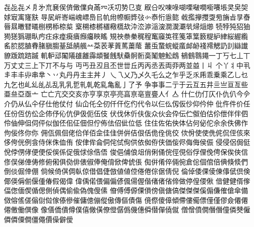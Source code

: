 %
%
%

㐂󠄀㐂󠄁㐂󠄂㐅󠄀㐆󠄀㐧󠄀㐬󠄀㐮󠄀㑨󠄀㑪󠄀㒈󠄀㒒󠄀㒵󠄀㒼󠄀㓁󠄀㓇󠄀㓛󠄀㔟󠄀㔾󠄀㕝󠄀
㕞󠄀㕣󠄀㕮󠄀㖦󠄀㖨󠄀㗅󠄀㗚󠄀㗞󠄀㗴󠄀㘅󠄀㘔󠄀㙊󠄀㚑󠄀㚖󠄀㚙󠄀㛏󠄀㝡󠄀㝢󠄀㝫󠄀㝬󠄀
㝵󠄀㞍󠄀㟁󠄀㟢󠄀㟨󠄀㟴󠄀㟽󠄀㠀󠄀㠯󠄀㠶󠄀㡀󠄀㡜󠄀㡡󠄀㢡󠄀㢭󠄀㣺󠄀㤗󠄀㤚󠄀㥯󠄀㦤󠄀
㦸󠄀㩜󠄀㩮󠄀㩳󠄀㪅󠄀㫄󠄀㫋󠄀㫖󠄀㫗󠄀㫪󠄀㫳󠄀㬎󠄀㬚󠄀㬜󠄀㬢󠄀㭭󠄀㭷󠄀㮇󠄀㮈󠄀㮍󠄀
㮤󠄀㮶󠄀㯃󠄀㯍󠄀㯰󠄀㯳󠄀㰏󠄀㰦󠄀㳃󠄀㳒󠄀㴑󠄀㴞󠄀㴱󠄀㵎󠄀㵤󠄀㶚󠄀㷀󠄀㷌󠄀㷔󠄀㸅󠄀
㸿󠄀㹀󠄀㹠󠄀㹦󠄀㹨󠄀㺃󠄀㺊󠄀㺔󠄀㻚󠄀㽗󠄀㽲󠄀㽵󠄀㽷󠄀㾮󠄀㾱󠄀㿉󠄀㿗󠄀㿜󠄀䀹󠄀䁘󠄀
䂓󠄀䄃󠄀䄅󠄀䅈󠄀䅏󠄀䅣󠄀䆴󠄀䆿󠄀䇦󠄀䇮󠄀䇳󠄀䈇󠄀䈎󠄀䉤󠄀䊓󠄀䋆󠄀䋖󠄀䋝󠄀䌂󠄀䌫󠄀
䍃󠄀䏮󠄀䏰󠄀䐈󠄀䐌󠄀䐗󠄀䐜󠄀䐢󠄀䑓󠄀䑛󠄀䑶󠄀䑺󠄀䒑󠄀䒳󠄀䒾󠄀䓔󠄀䔈󠄀䔍󠄀䔥󠄀䕃󠄀
䕺󠄀䖝󠄀䖸󠄀䖾󠄀䗥󠄀䗪󠄀䘏󠄀䘐󠄀䙁󠄀䙥󠄀䚡󠄀䚮󠄀䚯󠄀䜌󠄀䜟󠄀䝤󠄀䟦󠄀䟽󠄀䠖󠄀䠞󠄀
䡄󠄀䡎󠄀䢵󠄀䦰󠄀䧧󠄀䧺󠄀䨄󠄀䨩󠄀䪼󠄀䬸󠄀䬻󠄀䭾󠄀䯂󠄀䯊󠄀䯒󠄀䯨󠄀䰗󠄀䰠󠄀䰸󠄀䳄󠄀
䳑󠄀䳡󠄀䴇󠄀䵷󠄀一󠄀丁󠄀丂󠄀七󠄀丄󠄀丅󠄀万󠄀丈󠄀丈󠄁三󠄀上󠄀下󠄀丌󠄀不󠄀与󠄀与󠄁
丏󠄀丐󠄀丑󠄀丒󠄀且󠄀丕󠄀世󠄀丗󠄀丘󠄀丙󠄀丙󠄁丞󠄀丟󠄀両󠄀丣󠄀两󠄀並󠄀並󠄁丨󠄀丩󠄀
个󠄀丫󠄀丬󠄀中󠄀丮󠄀丯󠄀丰󠄀丰󠄁丱󠄀串󠄀丵󠄀丶󠄀丷󠄀丸󠄀丹󠄀丹󠄁主󠄀主󠄁丼󠄀丿󠄀
乀󠄀乁󠄀乂󠄀乃󠄀乄󠄀久󠄀乇󠄀么󠄀之󠄀乍󠄀乎󠄀乏󠄀乑󠄀乕󠄀乖󠄀乗󠄀乘󠄀乙󠄀乚󠄀乜󠄀
九󠄀乞󠄀也󠄀乢󠄀乣󠄀乨󠄀乩󠄀乱󠄀乳󠄀乳󠄁乴󠄀乵󠄀乹󠄀乾󠄀乿󠄀亀󠄀亂󠄀亅󠄀了󠄀予󠄀
争󠄀亊󠄀事󠄀二󠄀亍󠄀于󠄀云󠄀互󠄀五󠄀井󠄀亖󠄀亗󠄀亘󠄀亙󠄀些󠄀亜󠄀亝󠄀亞󠄀亟󠄀亠󠄀
亡󠄀亡󠄁亢󠄀交󠄀交󠄁亥󠄀亦󠄀亨󠄀享󠄀京󠄀亭󠄀亮󠄀亯󠄀亰󠄀亳󠄀亶󠄀亹󠄀人󠄀亻󠄀亼󠄀
什󠄀仁󠄀仂󠄀仃󠄀仄󠄀仆󠄀仇󠄀仈󠄀今󠄀今󠄁介󠄀仍󠄀从󠄀仏󠄀仐󠄀仔󠄀仕󠄀他󠄀仗󠄀付󠄀
仙󠄀仚󠄀仛󠄀仝󠄀仞󠄀仟󠄀仠󠄀仡󠄀仢󠄀代󠄀令󠄀以󠄀仨󠄀仫󠄀仭󠄀仮󠄀仯󠄀仰󠄀仱󠄀仲󠄀
仳󠄀仵󠄀件󠄀价󠄀任󠄀仼󠄀份󠄀仾󠄀仿󠄀伀󠄀企󠄀伂󠄀伃󠄀伈󠄀伉󠄀伊󠄀伋󠄀伌󠄀伍󠄀伎󠄀
伏󠄀伐󠄀休󠄀伒󠄀伕󠄀伖󠄀众󠄀伙󠄀会󠄀伜󠄀伝󠄀伫󠄀伮󠄀伯󠄀估󠄀伱󠄀伳󠄀伴󠄀伴󠄁伵󠄀
伶󠄀伷󠄀伸󠄀伹󠄀伺󠄀伻󠄀似󠄀伽󠄀伾󠄀佀󠄀佂󠄀佃󠄀但󠄀佇󠄀佈󠄀佉󠄀佋󠄀佌󠄀位󠄀低󠄀
住󠄀住󠄁佐󠄀佑󠄀佒󠄀体󠄀佔󠄀何󠄀佖󠄀佗󠄀佘󠄀余󠄀佚󠄀佛󠄀作󠄀佝󠄀佞󠄀佟󠄀你󠄀你󠄁
佣󠄀佤󠄀佩󠄀佪󠄀佬󠄀佮󠄀佯󠄀佰󠄀佱󠄀佳󠄀佳󠄁併󠄀併󠄁佶󠄀佷󠄀佸󠄀佹󠄀佺󠄀佻󠄀佼󠄀
佽󠄀佾󠄀使󠄀使󠄁侁󠄀侂󠄀侃󠄀侄󠄀侅󠄀來󠄀侈󠄀侉󠄀侊󠄀例󠄀侌󠄀侍󠄀侎󠄀侏󠄀侐󠄀侑󠄀
侒󠄀侓󠄀侔󠄀侖󠄀侗󠄀侘󠄀侙󠄀侚󠄀供󠄀依󠄀侞󠄀侟󠄀侠󠄀価󠄀侫󠄀侭󠄀侮󠄀侮󠄁侯󠄀侲󠄀
侵󠄀侵󠄁侶󠄀侷󠄀侹󠄀侻󠄀侼󠄀侽󠄀侾󠄀便󠄀便󠄁俀󠄀俁󠄀係󠄀促󠄀俄󠄀俅󠄀俆󠄀俈󠄀俉󠄀
俊󠄀俋󠄀俌󠄀俍󠄀俎󠄀俏󠄀俐󠄀俑󠄀俒󠄀俓󠄀俔󠄀俗󠄀俘󠄀俚󠄀俛󠄀俜󠄀保󠄀俟󠄀俠󠄀信󠄀
俢󠄀俣󠄀俤󠄀俥󠄀俦󠄀修󠄀俯󠄀俰󠄀俱󠄀俲󠄀俳󠄀俵󠄀俶󠄀俸󠄀俺󠄀俼󠄀俽󠄀俾󠄀俿󠄀倀󠄀
倁󠄀倂󠄀倄󠄀倅󠄀倆󠄀倇󠄀倉󠄀倊󠄀個󠄀倌󠄀倍󠄀倎󠄀倏󠄀倐󠄀們󠄀倒󠄀倓󠄀倔󠄀倖󠄀倗󠄀
倘󠄀候󠄀倚󠄀倛󠄀倜󠄀倝󠄀倞󠄀借󠄀倡󠄀倢󠄀倣󠄀値󠄀値󠄁倥󠄀倦󠄀倦󠄁倧󠄀倨󠄀倩󠄀倪󠄀
倫󠄀倬󠄀倭󠄀倮󠄀倰󠄀倲󠄀倳󠄀倵󠄀倶󠄀倹󠄀倻󠄀偀󠄀偁󠄀偂󠄀偃󠄀偅󠄀偆󠄀假󠄀偈󠄀偉󠄀
偉󠄁偊󠄀偌󠄀偎󠄀偏󠄀偏󠄁偐󠄀偑󠄀偒󠄀偓󠄀偕󠄀偖󠄀偖󠄁偗󠄀偙󠄀做󠄀停󠄀偟󠄀偠󠄀偢󠄀
偣󠄀健󠄀健󠄁偦󠄀偧󠄀偪󠄀偬󠄀偭󠄀偰󠄀偱󠄀偲󠄀側󠄀偵󠄀偶󠄀偷󠄀偸󠄀偽󠄀傀󠄀傁󠄀傃󠄀
傄󠄀傅󠄀傅󠄁傆󠄀傈󠄀傊󠄀傍󠄀傎󠄀傏󠄀傐󠄀傑󠄀傑󠄁傑󠄂傒󠄀傓󠄀傔󠄀傕󠄀傖󠄀傘󠄀備󠄀
傚󠄀傛󠄀傜󠄀傞󠄀傟󠄀傠󠄀傡󠄀傢󠄀傣󠄀傪󠄀催󠄀傭󠄀傯󠄀傰󠄀傱󠄀傲󠄀傳󠄀傴󠄀債󠄀傷󠄀
傹󠄀傺󠄀傻󠄀傽󠄀傾󠄀僀󠄀僂󠄀僃󠄀僄󠄀僅󠄀僅󠄁僇󠄀僉󠄀僊󠄀僊󠄁僊󠄂僌󠄀働󠄀僎󠄀像󠄀
像󠄁僐󠄀僑󠄀僓󠄀僔󠄀僕󠄀僖󠄀僘󠄀僙󠄀僚󠄀僜󠄀僝󠄀僞󠄀僟󠄀僡󠄀僢󠄀僣󠄀僤󠄀僥󠄀僦󠄀
僧󠄀僧󠄁僨󠄀僩󠄀僭󠄀僭󠄁僮󠄀僯󠄀僰󠄀僱󠄀僲󠄀僲󠄁僳󠄀僴󠄀僵󠄀僶󠄀價󠄀僺󠄀僻󠄀僾󠄀
